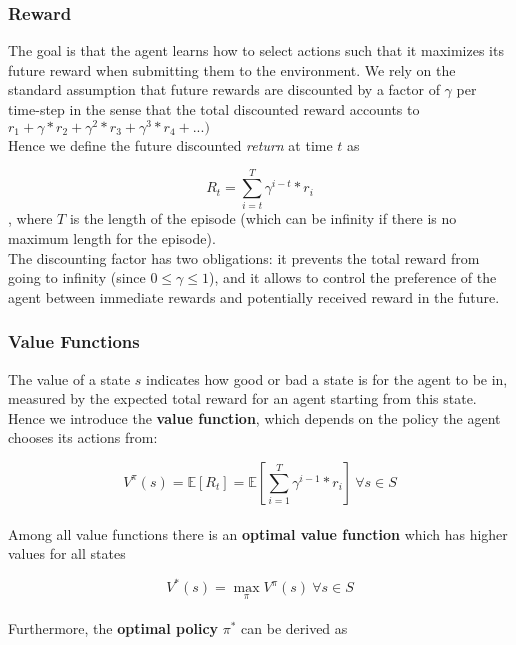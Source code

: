\subsubsection{Reward}

The goal is that the agent learns how to select actions such that it maximizes its future reward when submitting them to the environment.
We rely on the standard assumption that future rewards are discounted by a factor of $\gamma$ per time-step in the sense that the total discounted reward accounts to $r_1 + \gamma*r_2 + \gamma^2*r_3 + \gamma^3*r_4 + ...)$
\\
Hence we define the future discounted \textit{return} at time $t$ as 

\begin{equation}
R_t=\sum_{i=t}^{T}{\gamma^{i-t}{*}r_{i}}
\end{equation}
, where $T$ is the length of the episode (which can be infinity if there is no maximum length for the episode).
\\
The discounting factor has two obligations: it prevents the total reward from going to infinity (since $0 \leq \gamma \leq 1$), and it allows to control the preference of the agent between immediate rewards and potentially received reward in the future. \cite{rl-demysitifed2}

\subsubsection{Value Functions}

The value of a state $s$ indicates how good or bad a state is for the agent to be in, measured by the expected total reward for an agent starting from this state. Hence we introduce the \textbf{value function}, which depends on the policy the agent chooses its actions from:

\begin{equation}\label{eq:value-function}
V^{\pi}(s)=\mathbb{E}[R_t]=\mathbb{E}[\sum_{i=1}^{T}{\gamma^{i-1}{*}r_{i}}]\ \forall s \in S
\end{equation}
\\
Among all value functions there is an \textbf{optimal value function} which has higher values for all states

\begin{equation}\label{eq:optimal-value-function}
V^{*}(s)=\max_{\pi}V^{\pi}(s)\ \forall s \in S
\end{equation}
\\
Furthermore, the \textbf{optimal policy} $\pi^*$ can be derived as

